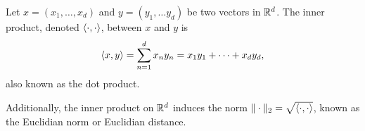 \documentclass[../thesis.tex]{subfiles}
\begin{document}
\begin{definition}\label{def:dot_prod}
    Let $x=(x_1, \dots, x_d)$ and $y=(y_1,\dots y_d)$ be two vectors in $\mathbb{R}^d$. The inner product, denoted $\langle\cdot, \cdot\rangle$, between $x$ and $y$ is
    \begin{equation*}
       \left \langle x,y \right \rangle = \sum_{n=1}^d x_n y_n= x_1 y_1 + \dots + x_d y_d,
    \end{equation*}
    also known as the dot product. 
\end{definition}

Additionally, the inner product on $\mathbb{R}^d$ induces the norm $\|\cdot\|_2 = \sqrt{\langle\cdot, \cdot\rangle}$, known as the Euclidian norm or Euclidian distance. 
\end{document}
